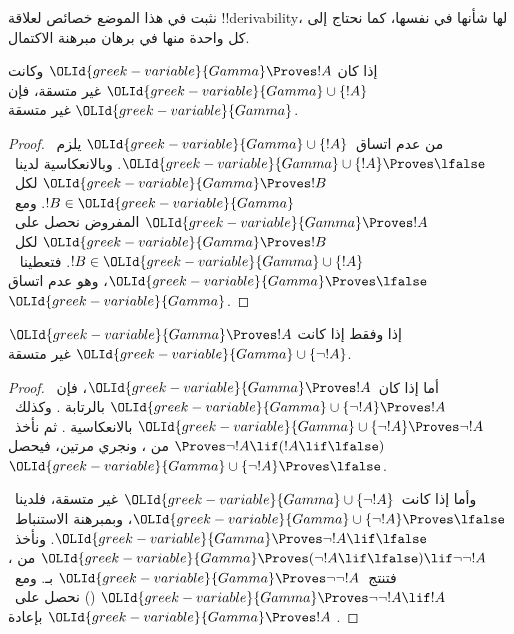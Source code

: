 \documentclass[../../../include/open-logic-section]{subfiles}
\begin{document}
      {}
      {}


نثبت في هذا الموضع خصائص لعلاقة !!{derivability}، لها شأنها في نفسها،
كما نحتاج إلى كل واحدة منها في برهان مبرهنة الاكتمال.

\begin{prop}
  إذا كان ${\OLId{greek-variable}{Gamma}} \Proves !A$ وكانت ${\OLId{greek-variable}{Gamma}} \cup \{!A\}$ غير متسقة،
  فإن ${\OLId{greek-variable}{Gamma}}$ غير متسقة.
\end{prop}

\begin{proof}
  من عدم اتساق~${\OLId{greek-variable}{Gamma}} \cup \{!A\}$ يلزم~${\OLId{greek-variable}{Gamma}} \cup \{!A\}
  \Proves \lfalse$. وبالانعكاسية 
  لدينا~${\OLId{greek-variable}{Gamma}}
  \Proves !B$ لكل~$!B \in {\OLId{greek-variable}{Gamma}}$. ومع~${\OLId{greek-variable}{Gamma}} \Proves !A$
  المفروض نحصل على~${\OLId{greek-variable}{Gamma}} \Proves !B$ لكل~$!B \in {\OLId{greek-variable}{Gamma}} \cup
  \{!A\}$. فتعطينا ~${\OLId{greek-variable}{Gamma}} \Proves
  \lfalse$، وهو عدم اتساق~${\OLId{greek-variable}{Gamma}}$.
\end{proof}

\begin{prop}
${\OLId{greek-variable}{Gamma}} \Proves !A$ إذا وفقط إذا كانت ${\OLId{greek-variable}{Gamma}} \cup \{\lnot !A\}$ غير متسقة.
\end{prop}

\begin{proof}
أما إذا كان~${\OLId{greek-variable}{Gamma}} \Proves !A$، فإن~${\OLId{greek-variable}{Gamma}} \cup \{\lnot !A\}
\Proves !A$ بالرتابة .
وكذلك~${\OLId{greek-variable}{Gamma}} \cup
\{\lnot !A\} \Proves \lnot !A$ بالانعكاسية .
ثم نأخذ~$\Proves \lnot !A \lif (!A \lif \lfalse)$ من
، ونجري  مرتين،
فيحصل~${\OLId{greek-variable}{Gamma}} \cup \{\lnot !A\} \Proves \lfalse$.

وأما إذا كانت~${\OLId{greek-variable}{Gamma}} \cup \{\lnot !A\}$ غير متسقة، فلدينا~${\OLId{greek-variable}{Gamma}}
\cup \{\lnot !A\} \Proves \lfalse$، وبمبرهنة الاستنباط~${\OLId{greek-variable}{Gamma}}
\Proves \lnot !A \lif \lfalse$. ونأخذ~${\OLId{greek-variable}{Gamma}} \Proves (\lnot !A
\lif \lfalse) \lif \lnot\lnot !A$ من ،
فتنتج~${\OLId{greek-variable}{Gamma}} \Proves \lnot\lnot !A$ بـ.
ومع~${\OLId{greek-variable}{Gamma}} \Proves \lnot\lnot !A \lif !A$ ()
نحصل على~${\OLId{greek-variable}{Gamma}} \Proves !A$ بإعادة .
\end{proof}
\end{document}
